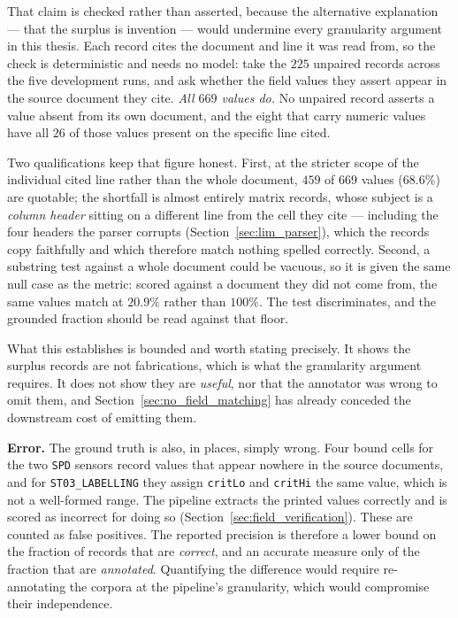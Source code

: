 \documentclass[11pt]{article}
\begin{document}
That claim is checked rather than asserted, because the alternative explanation
--- that the surplus is invention --- would undermine every granularity argument
in this thesis. Each record cites the document and line it was read from, so the
check is deterministic and needs no model: take the $225$ unpaired records
across the five development runs, and ask whether the field values they assert
appear in the source document they cite. \emph{All $669$ values do.} No unpaired
record asserts a value absent from its own document, and the eight that carry
numeric values have all $26$ of those values present on the specific line cited.

Two qualifications keep that figure honest. First, at the stricter scope of the
individual cited line rather than the whole document, $459$ of $669$ values
($68.6\%$) are quotable; the shortfall is almost entirely matrix records, whose
subject is a \emph{column header} sitting on a different line from the cell
they cite --- including the four headers the parser corrupts
(Section~\ref{sec:lim_parser}), which the records copy faithfully and which
therefore match nothing spelled correctly. Second, a substring test against a
whole document could be vacuous, so it is given the same null case as the
metric: scored against a document they did not come from, the same values match
at $20.9\%$ rather than $100\%$. The test discriminates, and the grounded
fraction should be read against that floor.

What this establishes is bounded and worth stating precisely. It shows the
surplus records are not fabrications, which is what the granularity argument
requires. It does not show they are \emph{useful}, nor that the annotator was
wrong to omit them, and Section~\ref{sec:no_field_matching} has already
conceded the downstream cost of emitting them.

\textbf{Error.} The ground truth is also, in places, simply wrong. Four bound
cells for the two \texttt{SPD} sensors record values that appear nowhere in the
source documents, and for \texttt{ST03\_LABELLING} they assign \texttt{critLo}
and \texttt{critHi} the same value, which is not a well-formed range. The pipeline
extracts the printed values correctly and is scored as incorrect for doing so
(Section~\ref{sec:field_verification}). These are counted as false positives. The reported
precision is therefore a lower bound on the fraction of records that are
\emph{correct}, and an accurate measure only of the fraction that are
\emph{annotated}. Quantifying the difference would require re-annotating the
corpora at the pipeline's granularity, which would compromise their
independence.
\end{document}

